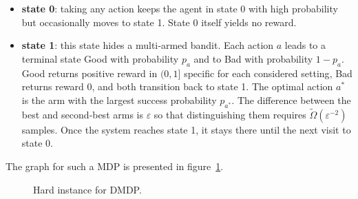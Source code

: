\documentclass{article}
\numberwithin{equation}{section}
\renewcommand{\epsilon}{\varepsilon}
\begin{document}
\begin{itemize}
    \item \textbf{state 0}: taking any action keeps the agent in state 0 with high probability but occasionally moves to state 1. State 0 itself yields no reward.
    \item \textbf{state 1}: this state hides a multi‑armed bandit. Each action $a$ leads to a terminal state Good with probability $p_a$ and to Bad with probability $1-p_a$. Good returns {positive reward in $(0, 1]$ specific for each considered setting}, Bad returns reward 0, and both transition back to state 1. The optimal action $a^*$ is the arm with the largest success probability $p_{a^*}$. The difference between the best and second‑best arms is {$\epsilon$} so that distinguishing them requires {$\widetilde{\Omega}(\epsilon^{-2})$} samples. Once the system reaches state 1, it stays there until the next visit to state 0.
\end{itemize}
The graph for such a MDP is presented in figure~\ref{fig:dmdp_hard_instance}.
\begin{figure}
\centering
{}
\caption{Hard instance for DMDP.}
\label{fig:dmdp_hard_instance}
\end{figure}
\end{document}
